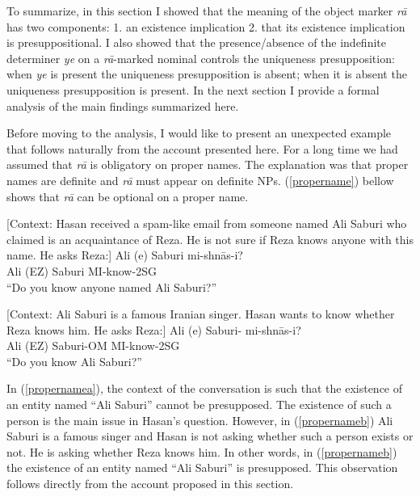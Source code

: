 \documentclass[12pt]{article}
\begin{document}
To summarize, in this section I showed that the meaning of the object marker \emph{r\={a}} has two components: 1. an existence implication 2. that its existence implication is presuppositional. I also showed that the presence/absence of the indefinite determiner \emph{ye} on a \emph{r\={a}}-marked nominal controls the uniqueness presupposition: when \emph{ye} is present the uniqueness presupposition is absent; when it is absent the uniqueness presupposition is present. In the next section I provide a formal analysis of the main findings summarized here.

Before moving to the analysis, I would like to present an unexpected example that follows naturally from the account presented here. For a long time we had assumed that \emph{r\={a}} is obligatory on proper names. The explanation was that proper names are definite and \emph{r\={a}} must appear on definite NPs. (\ref{propername}) bellow shows that \emph{r\={a}} can be optional on a proper name. 

	\begin {exe}
		\ex \label{propername} \begin {xlist}
		\ex \label {propernamea} {\footnotesize [Context: Hasan received a spam-like email from someone named Ali Saburi who claimed is an acquaintance of Reza. He is not sure if Reza knows anyone with this name. He asks Reza:]}
			\gll	Ali (e)	Saburi	mi-shn\={a}s-i?\\
				Ali ({\scriptsize EZ}) 	Saburi	{\scriptsize MI}-know-{\scriptsize 2SG}\\
			``Do you know anyone named Ali Saburi?''

		\ex \label {propernameb}{\footnotesize [Context: Ali Saburi is a famous Iranian singer. Hasan wants to know whether Reza knows him. He asks Reza:]}
			\gll	Ali (e) 	Saburi-	mi-shn\={a}s-i?\\
				Ali ({\scriptsize EZ})	Saburi-{\scriptsize OM}	{\scriptsize MI}-know-{\scriptsize 2SG}\\
			``Do you know Ali Saburi?''
	\end {xlist}
	\end {exe}

In (\ref{propernamea}), the context of the conversation is such that the existence of an entity named ``Ali Saburi'' cannot be presupposed. The existence of such a person is the main issue in Hasan's question. However, in (\ref{propernameb}) Ali Saburi is a famous singer and Hasan is not asking whether such a person exists or not. He is asking whether Reza knows him. In other words, in (\ref{propernameb}) the existence of an entity named ``Ali Saburi'' is presupposed. This observation follows directly from the account proposed in this section. 
\end{document}
